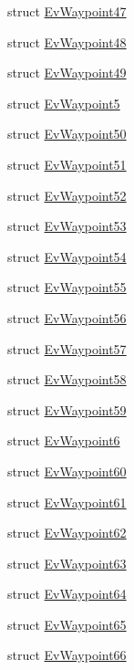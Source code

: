 \begin{DoxyCompactItemize}
struct \hyperlink{structcl__move__base__z_1_1EvWaypoint47}{Ev\+Waypoint47}
\item 
struct \hyperlink{structcl__move__base__z_1_1EvWaypoint48}{Ev\+Waypoint48}
\item 
struct \hyperlink{structcl__move__base__z_1_1EvWaypoint49}{Ev\+Waypoint49}
\item 
struct \hyperlink{structcl__move__base__z_1_1EvWaypoint5}{Ev\+Waypoint5}
\item 
struct \hyperlink{structcl__move__base__z_1_1EvWaypoint50}{Ev\+Waypoint50}
\item 
struct \hyperlink{structcl__move__base__z_1_1EvWaypoint51}{Ev\+Waypoint51}
\item 
struct \hyperlink{structcl__move__base__z_1_1EvWaypoint52}{Ev\+Waypoint52}
\item 
struct \hyperlink{structcl__move__base__z_1_1EvWaypoint53}{Ev\+Waypoint53}
\item 
struct \hyperlink{structcl__move__base__z_1_1EvWaypoint54}{Ev\+Waypoint54}
\item 
struct \hyperlink{structcl__move__base__z_1_1EvWaypoint55}{Ev\+Waypoint55}
\item 
struct \hyperlink{structcl__move__base__z_1_1EvWaypoint56}{Ev\+Waypoint56}
\item 
struct \hyperlink{structcl__move__base__z_1_1EvWaypoint57}{Ev\+Waypoint57}
\item 
struct \hyperlink{structcl__move__base__z_1_1EvWaypoint58}{Ev\+Waypoint58}
\item 
struct \hyperlink{structcl__move__base__z_1_1EvWaypoint59}{Ev\+Waypoint59}
\item 
struct \hyperlink{structcl__move__base__z_1_1EvWaypoint6}{Ev\+Waypoint6}
\item 
struct \hyperlink{structcl__move__base__z_1_1EvWaypoint60}{Ev\+Waypoint60}
\item 
struct \hyperlink{structcl__move__base__z_1_1EvWaypoint61}{Ev\+Waypoint61}
\item 
struct \hyperlink{structcl__move__base__z_1_1EvWaypoint62}{Ev\+Waypoint62}
\item 
struct \hyperlink{structcl__move__base__z_1_1EvWaypoint63}{Ev\+Waypoint63}
\item 
struct \hyperlink{structcl__move__base__z_1_1EvWaypoint64}{Ev\+Waypoint64}
\item 
struct \hyperlink{structcl__move__base__z_1_1EvWaypoint65}{Ev\+Waypoint65}
\item 
struct \hyperlink{structcl__move__base__z_1_1EvWaypoint66}{Ev\+Waypoint66}

\end{DoxyCompactItemize}

